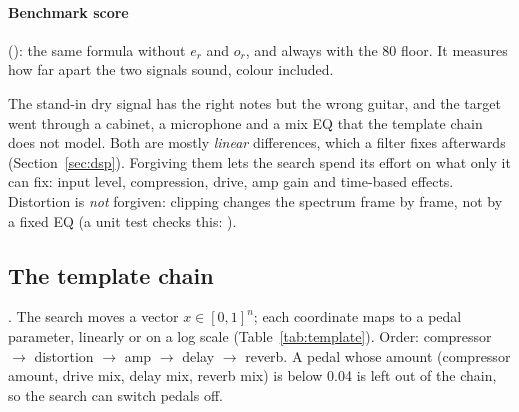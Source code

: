 \paragraph{Benchmark score} (): the same formula without
$e_r$ and $o_r$, and always with the 80\dB{} floor. It measures how far apart
the two signals sound, colour included.

\begin{keyidea}
The stand-in dry signal has the right notes but the wrong guitar, and the target
went through a cabinet, a microphone and a mix EQ that the template chain does
not model. Both are mostly \emph{linear} differences, which a filter fixes
afterwards (Section~\ref{sec:dsp}). Forgiving them lets the search spend its
effort on what only it can fix: input level, compression, drive, amp gain and
time-based effects. Distortion is \emph{not} forgiven: clipping changes the
spectrum frame by frame, not by a fixed EQ (a unit test checks this:
).
\end{keyidea}

\subsection{The template chain}

. The search moves a vector $x\in[0,1]^n$; each
coordinate maps to a pedal parameter, linearly or on a log scale
(Table~\ref{tab:template}). Order: compressor $\to$ distortion $\to$ amp $\to$
delay $\to$ reverb. A pedal whose amount (compressor amount, drive mix, delay
mix, reverb mix) is below 0.04 is left out of the chain, so the search can
switch pedals off.

